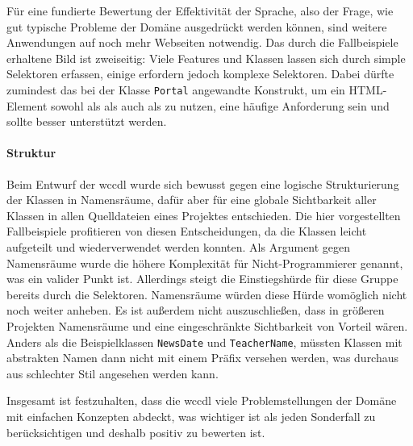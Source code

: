     Für eine fundierte Bewertung der Effektivität der Sprache,
    also der Frage, wie gut typische Probleme der Domäne ausgedrückt werden können,
    sind weitere Anwendungen auf noch mehr Webseiten notwendig.
    Das durch die Fallbeispiele erhaltene Bild ist zweiseitig:
    Viele Features und Klassen lassen sich durch simple Selektoren erfassen,
    einige erfordern jedoch komplexe Selektoren.
    Dabei dürfte zumindest das bei der Klasse \texttt{Portal} angewandte Konstrukt,
    um ein HTML-Element sowohl als {\contentFeature} als auch als {} zu nutzen,
    eine häufige Anforderung sein und sollte besser unterstützt werden.

    \paragraph{Struktur}
    Beim Entwurf der \gls{wccdl} wurde sich bewusst gegen
    eine logische Strukturierung der Klassen in Namensräume,
    dafür aber für eine globale Sichtbarkeit aller Klassen
    in allen Quelldateien eines Projektes entschieden.
    Die hier vorgestellten Fallbeispiele profitieren von diesen Entscheidungen,
    da die Klassen leicht aufgeteilt und wiederverwendet werden konnten.
    Als Argument gegen Namensräume wurde die höhere Komplexität für
    Nicht-Programmierer genannt, was ein valider Punkt ist.
    Allerdings steigt die Einstiegshürde für diese Gruppe bereits
    durch die Selektoren. Namensräume würden diese Hürde womöglich nicht noch weiter anheben.
    Es ist außerdem nicht auszuschließen, dass in größeren Projekten
    Namensräume und eine eingeschränkte Sichtbarkeit von Vorteil wären.
    Anders als die Beispielklassen \texttt{NewsDate} und \texttt{TeacherName},
    müssten Klassen mit abstrakten Namen dann nicht mit einem Präfix versehen werden,
    was durchaus aus schlechter Stil angesehen werden kann.

    Insgesamt ist festzuhalten, dass die \gls{wccdl} viele Problemstellungen der Domäne
    mit einfachen Konzepten abdeckt, was wichtiger ist als jeden Sonderfall zu berücksichtigen
    und deshalb positiv zu bewerten ist.